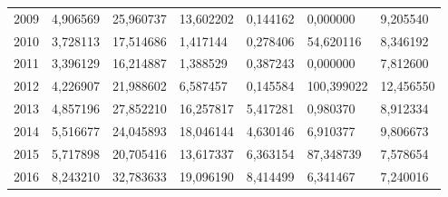 \begin{table}
\begin{tabular}{p{1cm}p{2cm}p{2cm}p{2cm}p{2cm}p{2cm}p{2cm}}
 2009 &                            4,906569 &             25,960737 &                             13,602202 &                                     0,144162 &   0,000000 &                                   9,205540 \\
 2010 &                            3,728113 &             17,514686 &                              1,417144 &                                     0,278406 &  54,620116 &                                   8,346192 \\
 2011 &                            3,396129 &             16,214887 &                              1,388529 &                                     0,387243 &   0,000000 &                                   7,812600 \\
 2012 &                            4,226907 &             21,988602 &                              6,587457 &                                     0,145584 & 100,399022 &                                  12,456550 \\
 2013 &                            4,857196 &             27,852210 &                             16,257817 &                                     5,417281 &   0,980370 &                                   8,912334 \\
 2014 &                            5,516677 &             24,045893 &                             18,046144 &                                     4,630146 &   6,910377 &                                   9,806673 \\
 2015 &                            5,717898 &             20,705416 &                             13,617337 &                                     6,363154 &  87,348739 &                                   7,578654 \\
 2016 &                            8,243210 &             32,783633 &                             19,096190 &                                     8,414499 &   6,341467 &                                   7,240016 \\
\bottomrule
\end{tabular}
\end{table}
